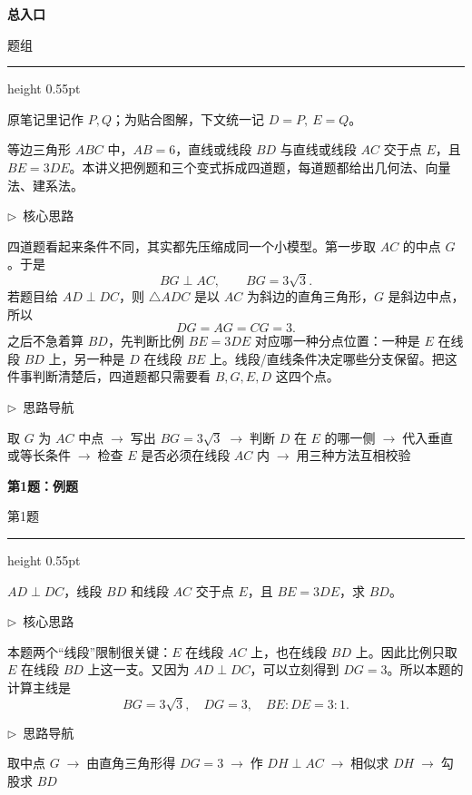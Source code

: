 \documentclass{exam-zh}
\newcommand{\edukai}{\kaishu}
\newcommand{\eduSectionTitle}[1]{%
  \needspace{5\baselineskip}%
  \vspace{2mm}
  {\color{edu-blue}\bfseries\large #1}\par
  \vspace{3mm}
}
\newenvironment{eduAuxItem}[1]{%
  \needspace{4\baselineskip}%
  \vspace{2mm}
  \par\noindent
  \hangindent=8mm\hangafter=1
  {\color{edu-blue}\edukai $\triangleright$~#1}\enspace
  \begingroup
  \color{edu-ink}
  \edukai
}{%
  \endgroup
  \par
  \vspace{4mm}
}
\newenvironment{eduProblemBlock}[1][题目]{%
  \needspace{8\baselineskip}
  {\small\color{edu-muted}#1}\par
  \vspace{1.5mm}
  {\color{edu-blue}\hrule height 0.55pt}
  \vspace{4.5mm}
  \begingroup
  \color{edu-ink}
  \large
  \setlength{\parskip}{2.2mm}
  \linespread{1.20}\selectfont
}{%
  \par
  \endgroup
  \vspace{6mm}
}
\begin{document}
\eduSectionTitle{总入口}

\begin{eduProblemBlock}[题组]
原笔记里记作 $P,Q$；为贴合图解，下文统一记 $D=P,\ E=Q$。

等边三角形 $ABC$ 中，$AB=6$，直线或线段 $BD$ 与直线或线段 $AC$ 交于点 $E$，且 $BE=3DE$。本讲义把例题和三个变式拆成四道题，每道题都给出几何法、向量法、建系法。

\end{eduProblemBlock}





\begin{eduAuxItem}{核心思路}
四道题看起来条件不同，其实都先压缩成同一个小模型。第一步取 $AC$ 的中点 $G$。于是
$$BG\perp AC,\qquad BG=3\sqrt3.$$
若题目给 $AD\perp DC$，则 $\triangle ADC$ 是以 $AC$ 为斜边的直角三角形，$G$ 是斜边中点，所以
$$DG=AG=CG=3.$$
之后不急着算 $BD$，先判断比例 $BE=3DE$ 对应哪一种分点位置：一种是 $E$ 在线段 $BD$ 上，另一种是 $D$ 在线段 $BE$ 上。线段/直线条件决定哪些分支保留。把这件事判断清楚后，四道题都只需要看 $B,G,E,D$ 这四个点。
\end{eduAuxItem}




\begin{eduAuxItem}{思路导航}
取 $G$ 为 $AC$ 中点$\;\to\;$写出 $BG=3\sqrt3$$\;\to\;$判断 $D$ 在 $E$ 的哪一侧$\;\to\;$代入垂直或等长条件$\;\to\;$检查 $E$ 是否必须在线段 $AC$ 内$\;\to\;$用三种方法互相校验\end{eduAuxItem}



\clearpage
\eduSectionTitle{第1题：例题}

\begin{eduProblemBlock}[第1题]
$AD\perp DC$，线段 $BD$ 和线段 $AC$ 交于点 $E$，且 $BE=3DE$，求 $BD$。

\end{eduProblemBlock}





\begin{eduAuxItem}{核心思路}
本题两个“线段”限制很关键：$E$ 在线段 $AC$ 上，也在线段 $BD$ 上。因此比例只取 $E$ 在线段 $BD$ 上这一支。又因为 $AD\perp DC$，可以立刻得到 $DG=3$。所以本题的计算主线是
$$BG=3\sqrt3,\quad DG=3,\quad BE:DE=3:1.$$
\end{eduAuxItem}




\begin{eduAuxItem}{思路导航}
取中点 $G$$\;\to\;$由直角三角形得 $DG=3$$\;\to\;$作 $DH\perp AC$$\;\to\;$相似求 $DH$$\;\to\;$勾股求 $BD$\end{eduAuxItem}
\end{document}
